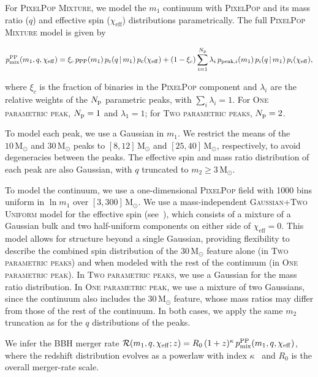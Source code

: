 \documentclass[twocolumn,twocolappendix,linenumbers]{aastex631}
\newcommand{\PixelPop}{\textsc{PixelPop}\xspace}
\newcommand{\PPMixture}{\textsc{PixelPop Mixture}\xspace}
\newcommand{\oneparpeak}{\textsc{One parametric peak}\xspace}
\newcommand{\twoparpeaks}{\textsc{Two parametric peaks}\xspace}
\newcommand{\gtwou}{\textsc{Gaussian+Two Uniform}\xspace}
\newcommand{\Msun}{\ensuremath{\mathrm{M}_\odot}\xspace}
\newcommand{\chieff}{\ensuremath{\chi_\mathrm{eff}}\xspace}
\begin{document}
For \PPMixture, we model the $m_1$ continuum with \PixelPop and its mass ratio ($q$) and effective spin (\chieff) distributions parametrically.
The full \PPMixture model is given by

\begin{widetext}
\begin{equation}\label{eq:pp-mixture}
  p_{\rm mix}^{\rm PP}(m_1,q,\chieff) =
  \xi_c\,p_{\rm PP}(m_1)\,
  p_{\rm c}(q\,|\,m_1)\,p_{\rm c}(\chieff) +
  (1-\xi_c)\sum_{i=1}^{N_{\rm p}}
  \lambda_i\,p_{{\rm peak},i}(m_1)\,p_{i}(q\,|\,m_1)\,p_{i}(\chieff),
\end{equation}
\end{widetext}

where $\xi_c$ is the fraction of binaries in the \PixelPop component and $\lambda_i$ are the relative weights of the $N_{\rm p}$ parametric peaks, with $\sum_i \lambda_i = 1$.
For \oneparpeak, $N_{\rm p}=1$ and $\lambda_1=1$; for \twoparpeaks, $N_{\rm p}=2$.

To model each peak, we use a Gaussian in $m_1$.
We restrict the means of the $10\,\Msun$ and $30\,\Msun$ peaks to $[8, 12]\,\Msun$ and $[25, 40]\,\Msun$, respectively, to avoid degeneracies between the peaks.
The effective spin and mass ratio distribution of each peak are also Gaussian, with $q$ truncated to $m_2 \geq 3\,\Msun$.

To model the continuum, we use a one-dimensional \PixelPop field with 1000 bins uniform in $\ln m_1$ over $[3,300]\,\Msun$.
We use a mass-independent \gtwou model for the effective spin (see~\cite{Alvarez-Lopez:2026ymo}), which consists of a mixture of a Gaussian bulk and two half-uniform components on either side of $\chieff = 0$.
This model allows for structure beyond a single Gaussian, providing flexibility to describe the combined spin distribution of the $30\,\Msun$ feature alone (in \twoparpeaks) and when modeled with the rest of the continuum (in \oneparpeak).
In \twoparpeaks, we use a Gaussian for the mass ratio distribution.
In \oneparpeak, we use a mixture of two Gaussians, since the continuum also includes the $30\,\Msun$ feature, whose mass ratios may differ from those of the rest of the continuum.
In both cases, we apply the same $m_2$ truncation as for the $q$ distributions of the peaks.

We infer the \ac{BBH} merger rate $\mathcal{R}(m_1,q,\chieff;z)
= R_0\,(1+z)^\kappa\, p_{\rm mix}^{\rm PP}(m_1,q,\chieff)$, where the redshift distribution evolves as a powerlaw with index $\kappa$~\citep{Fishbach:2018edt} and $R_0$ is the overall merger-rate scale.
\end{document}
